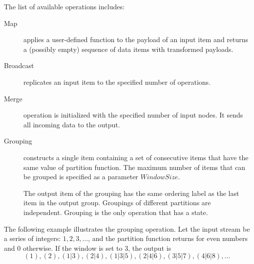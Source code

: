 The list of available operations includes:
\begin {description}
  \item [Map] applies a user-defined function to the payload of an input item and returns a (possibly empty) sequence of data items with transformed payloads. 

  \item [Broadcast] replicates an input item to the specified number of operations.

  \item [Merge] operation is initialized with the specified number of input nodes. It sends all incoming data to the output.

  \item [Grouping] constructs a single item containing a set of consecutive items that have the same value of partition function. The maximum number of items that can be grouped is specified as a parameter  $Window Size$. 
    
  The output item of the grouping has the same ordering label as the last item in the output group. Groupings of different partitions are independent. Grouping is the only operation that has a state.
\end {description}

The following example illustrates  the grouping operation. Let the input stream be a series of integers: $ 1,2,3, \ldots$, and the  partition function returns for even numbers and 0 otherwise. If the window is set to 3, the output is 
$$(1), (2), (1|3), (2|4), (1|3|5), (2|4|6), (3|5|7), (4|6|8), \ldots$$
